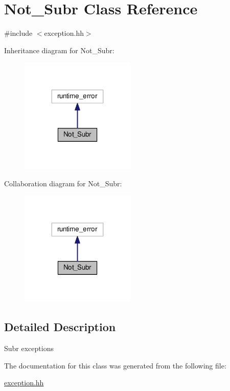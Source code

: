 \hypertarget{classNot__Subr}{\section{Not\-\_\-\-Subr Class Reference}
\label{classNot__Subr}
}


{\ttfamily \#include $<$exception.\-hh$>$}



Inheritance diagram for Not\-\_\-\-Subr\-:\nopagebreak
\begin{figure}[H]
\begin{center}
\leavevmode
\includegraphics[width=155pt]{classNot__Subr__inherit__graph}
\end{center}
\end{figure}


Collaboration diagram for Not\-\_\-\-Subr\-:\nopagebreak
\begin{figure}[H]
\begin{center}
\leavevmode
\includegraphics[width=155pt]{classNot__Subr__coll__graph}
\end{center}
\end{figure}


\subsection{Detailed Description}
Subr exceptions 

The documentation for this class was generated from the following file\-:\begin{DoxyCompactItemize}
\item 
\hyperlink{exception_8hh}{exception.\-hh}\end{DoxyCompactItemize}
